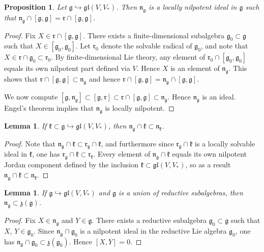 \documentclass{article}
\def\gl{\mathfrak {gl}}
\def\g{\mathfrak {g}}
\def\n{\mathfrak {n}}
\def\z{\mathfrak {z}}
\def\k{\mathfrak{k}}
\def\r{\mathfrak{r}}
\newtheorem{lemma}[thm]{Lemma}
\newtheorem{prop}[thm]{Proposition}
\begin{document}
\begin{prop} \label{nilcommutator}
Let $\g \hookrightarrow \gl(V,V_*)$.  Then $\n_\g$ is a locally nilpotent ideal in $\g$ such that $\n_\g \cap [\g,\g] = \r \cap [\g,\g]$.
\end{prop}


\begin{proof}
Fix $X \in \r \cap [\g,\g]$.  There exists a finite-dimensional subalgebra $\g_0 \subset \g$ such that $X \in [\g_0, \g_0]$.  Let $\r_0$ denote the solvable radical of $\g_0$, and note that $X \in \r \cap \g_0 \subset \r_0$. By finite-dimensional Lie theory, any element of $\r_0 \cap [\g_0 , \g_0]$ equals its own nilpotent part defined via $V$.  Hence $X$ is an element of $\n_\g$.  This shows that $\r \cap [\g,\g] \subset \n_\g$ and hence $\r \cap [\g,\g] = \n_\g \cap [\g,\g]$.

We now compute $[\g, \n_\g] \subset [\g , \r] \subset \r \cap [\g,\g] \subset \n_\g$.  Hence $\n_\g$ is an ideal.  Engel's theorem implies that $\n_\g$ is locally nilpotent. 
\end{proof}


\begin{lemma} \label{nilradicalcontainment}
If $\k \subset \g \hookrightarrow \gl(V,V_*)$, then  $\n_\g \cap \k \subset \n_\k$.
\end{lemma}

\begin{proof}
Note that $\n_\g \cap  \k \subset \r_\g \cap \k$, and furthermore since $\r_\g \cap \k$ is a locally solvable ideal in $\k$, one has $ \r_\g \cap \k \subset \r_\k$.  Every element of $\n_\g \cap  \k$ equals its own nilpotent Jordan component defined by the inclusion $\k \subset \gl(V,V_*)$, so as a result $\n_\g \cap \k \subset \n_\k$.
\end{proof}


\begin{lemma} \label{locreductivenilradical}
If $\g \hookrightarrow \gl(V,V_*)$ and $\g$ is a union of reductive subalgebras, then $\n_\g \subset \z(\g)$.
\end{lemma}


\begin{proof}
Fix $X \in \n_\g$ and $Y \in \g$.  There exists a reductive subalgebra $\g_0 \subset \g$ such that $X$, $Y \in \g_0$.  Since $\n_\g \cap \g_0$ is a nilpotent ideal in the reductive Lie algebra $\g_0$, one has $\n_\g \cap \g_0 \subset \z(\g_0)$.  Hence $[X , Y]=0$.
\end{proof}
\end{document}
